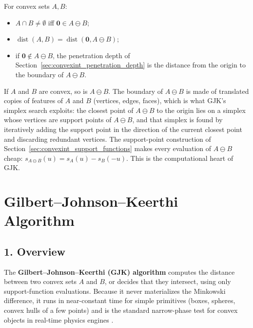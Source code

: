 \begin{theorem}\label{thm:convexint_minkowski}
  For convex sets $A, B$:
  \begin{itemize}
    \item $A \cap B \neq \emptyset$ iff $\mathbf{0} \in A \ominus B$;
    \item $\operatorname{dist}(A, B) = \operatorname{dist}(\mathbf{0},
      A \ominus B)$;
    \item if $\mathbf{0} \notin A \ominus B$, the penetration depth of
      Section~\ref{sec:convexint_penetration_depth} is the distance from
      the origin to the boundary of $A \ominus B$.
  \end{itemize}
\end{theorem}

If $A$ and $B$ are convex, so is $A \ominus B$. The boundary of
$A \ominus B$ is made of translated copies of features of $A$ and $B$
(vertices, edges, faces), which is what GJK's simplex search exploits: the
closest point of $A \ominus B$ to the origin lies on a simplex whose
vertices are support points of $A \ominus B$, and that simplex is found by
iteratively adding the support point in the direction of the current
closest point and discarding redundant vertices. The
support-point construction of Section~\ref{sec:convexint_support_functions}
makes every evaluation of $A \ominus B$ cheap: $s_{A\ominus B}(u) =
s_A(u) - s_B(-u)$. This is the computational heart of GJK.


\section{Gilbert--Johnson--Keerthi Algorithm}
\label{sec:convexint_gjk}

\subsection{1. Overview}

The \textbf{Gilbert--Johnson--Keerthi (GJK) algorithm} \cite{gilbert1988}
computes the distance between two convex sets $A$ and $B$, or decides that
they intersect, using only support-function evaluations. Because it never
materializes the Minkowski difference, it runs in near-constant time for
simple primitives (boxes, spheres, convex hulls of a few points) and is the
standard narrow-phase test for convex objects in real-time physics engines
\cite{ericson2004,vandenbergen2004}.

